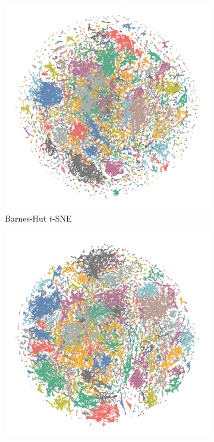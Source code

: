 \begin{appendix}
\begin{figure}[tbp]
  \centering
  \begin{subfigure}{0.45\linewidth}
    \centering
    \includegraphics[width=\linewidth]{img/emb/bhtsne_com-amazon}
    \caption{Barnes-Hut $t$-SNE}
  \end{subfigure}
\begin{subfigure}{0.45\linewidth}
  \centering
    \includegraphics[width=\linewidth]{img/emb/fitsne_com-amazon}

\end{subfigure}
\end{figure}
\end{appendix}
